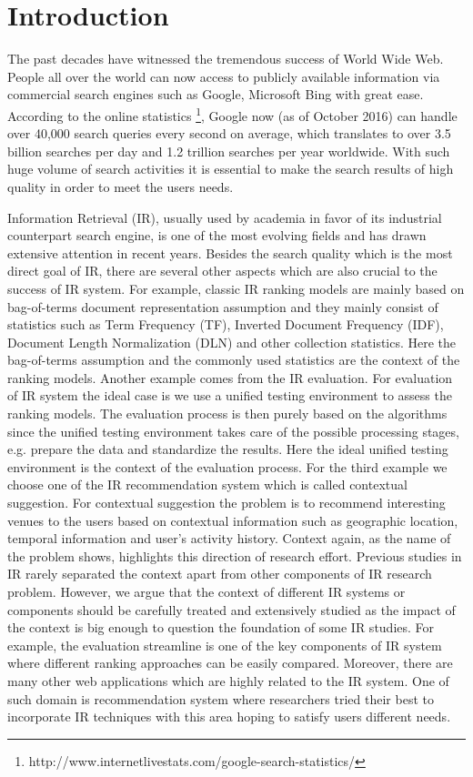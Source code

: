 %
%
\chapter{Introduction}
The past decades have witnessed the tremendous success of World Wide Web. 
People all over the world can now access to publicly available 
information via commercial search engines such as Google, Microsoft Bing 
with great ease. According to the online statistics 
\footnote{http://www.internetlivestats.com/google-search-statistics/}, 
Google now (as of October 2016) can handle over 40,000 search queries 
every second on average, which translates to over 3.5 billion searches 
per day and 1.2 trillion searches per year worldwide. 
With such huge volume of search activities it is essential to make the 
search results of high quality in order to meet the users needs.

Information Retrieval (IR), usually used by academia in favor of its 
industrial counterpart search engine, is one of the most evolving fields and 
has drawn extensive attention in recent years. 
Besides the search quality which is the most direct goal of IR, there 
are several other aspects which are also crucial to the success of IR 
system. 
For example, classic IR ranking models are mainly based on 
bag-of-terms document representation assumption and they mainly 
consist of statistics such as Term Frequency (TF), 
Inverted Document Frequency (IDF), 
Document Length Normalization (DLN) and other collection statistics. 
Here the bag-of-terms assumption 
and the commonly used statistics are the context of the ranking models. 
Another example comes from the IR evaluation. 
For evaluation of IR system the ideal case is we use a unified testing 
environment to assess the ranking models. 
The evaluation process is then purely based on the algorithms since the 
unified testing environment takes care of the possible processing stages, 
e.g. prepare the data and standardize the results. 
Here the ideal unified testing environment is the context of the evaluation 
process. 
For the third example we choose one of the IR recommendation system which is 
called contextual suggestion. For contextual suggestion the problem is to 
recommend interesting venues to the users based on contextual information 
such as geographic location, temporal information and user's activity history. 
Context again, as the name of the problem shows, highlights this direction 
of research effort. 
Previous studies in IR rarely separated the context apart from other 
components of IR research problem. However, we argue that the context of 
different IR systems or components should be carefully treated and extensively 
studied as the impact of the context is big enough to question the foundation 
of some IR studies.
For example, the evaluation streamline is one of the key 
components of IR system where different ranking approaches can be 
easily compared. Moreover, there are many other web applications which 
are highly related to the IR system. One of such domain is recommendation 
system where researchers tried their best to incorporate IR techniques 
with this area hoping to satisfy users different needs.


